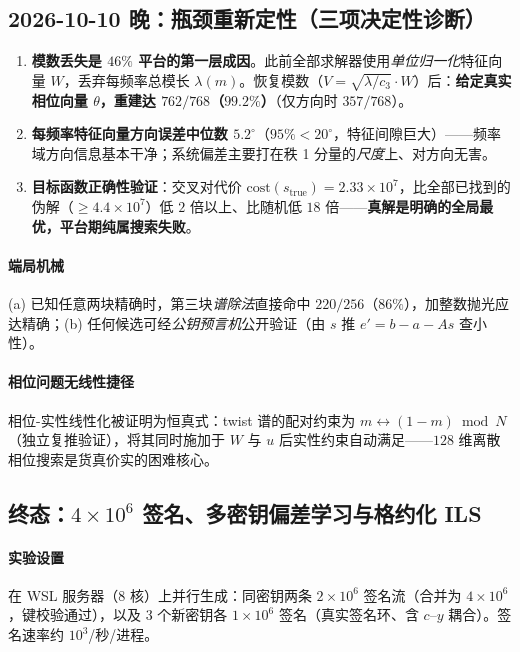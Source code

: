 \documentclass[11pt,a4paper]{ctexart}
\begin{document}
\subsection{2026-10-10 晚：瓶颈重新定性（三项决定性诊断）}\label{sec:night}

\begin{enumerate}
\item \textbf{模数丢失是 $46\%$ 平台的第一层成因}。此前全部求解器使用\emph{单位归一化}特征向量 $W$，丢弃每频率总模长 $\lambda(m)$。恢复模数（$V=\sqrt{\lambda/c_3}\cdot W$）后：\textbf{给定真实相位向量 $\theta$，重建达 $762/768$（$99.2\%$）}（仅方向时 $357/768$）。
\item \textbf{每频率特征向量方向误差中位数 $5.2^\circ$}（$95\%<20^\circ$，特征间隙巨大）——频率域方向信息基本干净；系统偏差主要打在秩 1 分量的\emph{尺度}上、对方向无害。
\item \textbf{目标函数正确性验证}：交叉对代价 $\mathrm{cost}(s_{\text{true}})=2.33\times10^7$，比全部已找到的伪解（$\ge4.4\times10^7$）低 $2$ 倍以上、比随机低 $18$ 倍——\textbf{真解是明确的全局最优，平台期纯属搜索失败}。
\end{enumerate}

\paragraph{端局机械} (a) 已知任意两块精确时，第三块\emph{谱除法}直接命中 $220/256$（$86\%$），加整数抛光应达精确；(b) 任何候选可经\emph{公钥预言机}公开验证（由 $s$ 推 $e'=b-a-As$ 查小性）。

\paragraph{相位问题无线性捷径} 相位-实性线性化被证明为恒真式：twist 谱的配对约束为 $m\leftrightarrow(1-m)\bmod N$（独立复推验证），将其同时施加于 $W$ 与 $u$ 后实性约束自动满足——$128$ 维离散相位搜索是货真价实的困难核心。

\subsection{终态：$4\times10^6$ 签名、多密钥偏差学习与格约化 ILS}\label{sec:final}

\paragraph{实验设置} 在 WSL 服务器（8 核）上并行生成：同密钥两条 $2\times10^6$ 签名流（合并为 $4\times10^6$，键校验通过），以及 $3$ 个新密钥各 $1\times10^6$ 签名（真实签名环、含 $c$--$y$ 耦合）。签名速率约 $10^3$/秒/进程。
\end{document}
